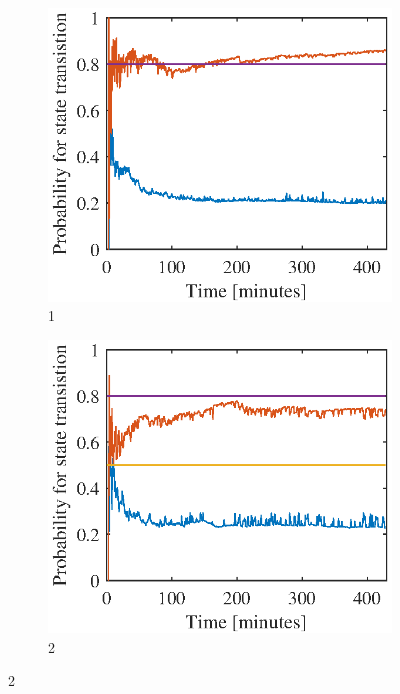 \begin{figure}[htbp]
	\begin{subfigure}[t]{0.5\linewidth}
		\centering
		\includegraphics[width=1\linewidth]{chapters/appendix/figures/learning_curves/obs1}
		\caption{1}
	\end{subfigure}
	\hspace*{\fill}
	\begin{subfigure}[t]{0.5\linewidth}
		\centering
		\includegraphics[width=1\linewidth]{chapters/appendix/figures/learning_curves/obs2}
		\caption{2}
	\end{subfigure}



\end{figure}
